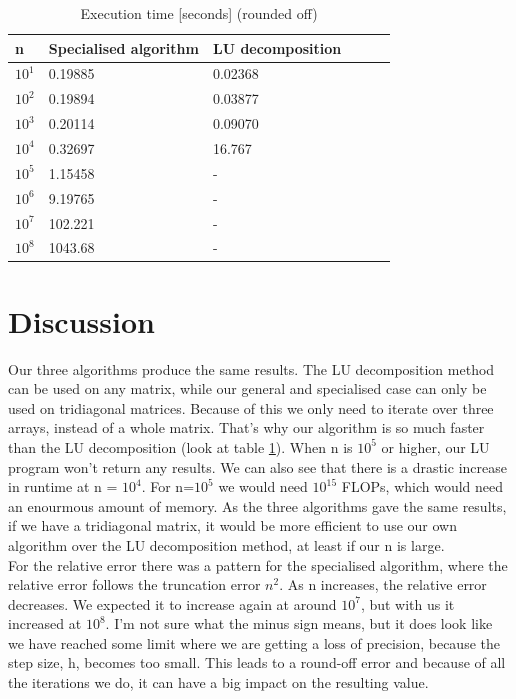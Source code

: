\documentclass[oneside, final, 11pt, english, twocolumn]{article}
\begin{document}
\begin{table}[H]
    \caption{Execution time [seconds] (rounded off)}
    \label{tab:time}
    \begin{tabular}{|l |l |l| lll}%
    \hline
      \textbf{n}& {Specialised algorithm} & {LU decomposition} \\ 
      \hline
      $10^1$ &  0.19885 & 0.02368\\
       $10^2$ & 0.19894 &  0.03877\\
      $10^3$ & 0.20114&  0.09070\\
      $10^4$ &0.32697 & 16.767 \\
      $10^5$ & 1.15458&   -\\ 
      $10^6$ & 9.19765&  -\\ 
      $10^7$ &  102.221& - \\ 
      $10^8$ & 1043.68 &  -\\
      \hline
    \end{tabular}
\end{table} 

\section{Discussion}

Our three algorithms produce the same results. The LU decomposition method can be used on any matrix, while our general and specialised case can only be used on tridiagonal matrices. Because of this we only need to iterate over three arrays, instead of a whole matrix. That's why our algorithm is so much faster than the LU decomposition (look at table \ref{tab:time}). When n is $10^5$ or higher, our LU program won't return any results. We can also see that there is a drastic increase in runtime at n = $10^4$. For n=$10^5$ we would need $10^{15}$ FLOPs, which would need an enourmous amount of memory. As the three algorithms gave the same results, if we have a tridiagonal matrix, it would be more efficient to use our own algorithm over the LU decomposition method, at least if our n is large.  \\

For the relative error there was a pattern for the specialised algorithm, where the relative error follows the truncation error $n^2$. As n increases, the relative error decreases. We expected it to increase again at around $10^7$, but with us it increased at $10^8$. I'm not sure what the minus sign means, but it does look like we have reached some limit where we are getting a loss of precision, because the step size, h, becomes too small. This leads to a round-off error and because of all the iterations we do, it can have a big impact on the resulting value. \\
\end{document}
